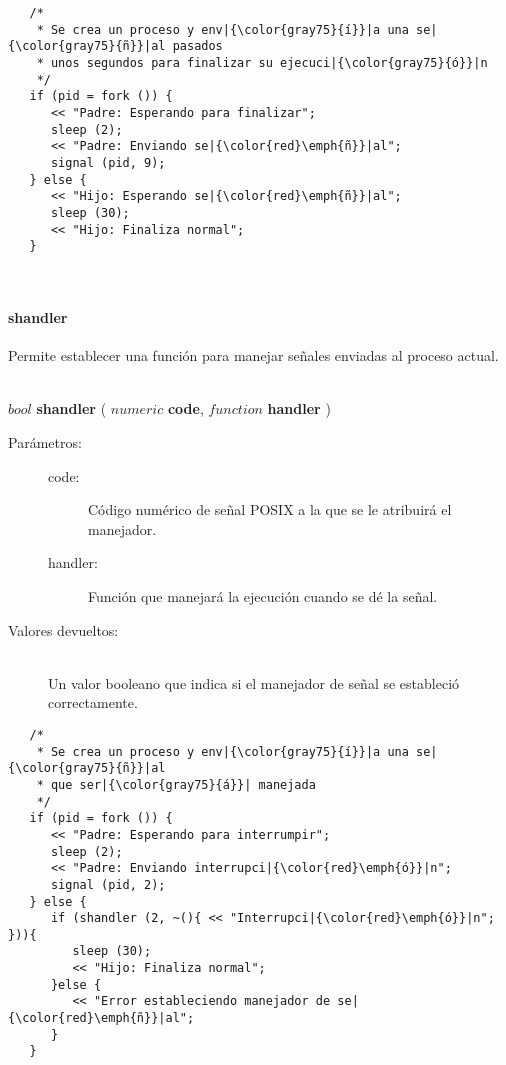 \begin{lstlisting}  
   /*
    * Se crea un proceso y env|{\color{gray75}{í}}|a una se|{\color{gray75}{ñ}}|al pasados
    * unos segundos para finalizar su ejecuci|{\color{gray75}{ó}}|n
    */
   if (pid = fork ()) {
      << "Padre: Esperando para finalizar";
      sleep (2);
      << "Padre: Enviando se|{\color{red}\emph{ñ}}|al";
      signal (pid, 9);
   } else {
      << "Hijo: Esperando se|{\color{red}\emph{ñ}}|al";
      sleep (30);
      << "Hijo: Finaliza normal";
   }
\end{lstlisting}
\hfill\\ 

\paragraph{shandler}
Permite establecer una función para manejar señales enviadas al proceso actual. 

\hfill \\ $bool$ \textbf{shandler} ( $numeric$ \textbf{code}, $function$ \textbf{handler} )  
\begin{description}
\item [Parámetros:] \hfill 
   \begin{description}
   \item[code:] Código numérico de señal POSIX a la que se le atribuirá el manejador.
   \item[handler:] Función que manejará la ejecución cuando se dé la señal.
   \end{description}
\item[Valores devueltos:] \hfill \\
   Un valor booleano que indica si el manejador de señal se estableció correctamente. 
\end{description}
     
\begin{lstlisting}  
   /*
    * Se crea un proceso y env|{\color{gray75}{í}}|a una se|{\color{gray75}{ñ}}|al 
    * que ser|{\color{gray75}{á}}| manejada
    */
   if (pid = fork ()) {
      << "Padre: Esperando para interrumpir";
      sleep (2);
      << "Padre: Enviando interrupci|{\color{red}\emph{ó}}|n";
      signal (pid, 2);
   } else {
      if (shandler (2, ~(){ << "Interrupci|{\color{red}\emph{ó}}|n"; })){
         sleep (30);
         << "Hijo: Finaliza normal";
      }else {
         << "Error estableciendo manejador de se|{\color{red}\emph{ñ}}|al";
      }
   }
\end{lstlisting}
\hfill\\ 

